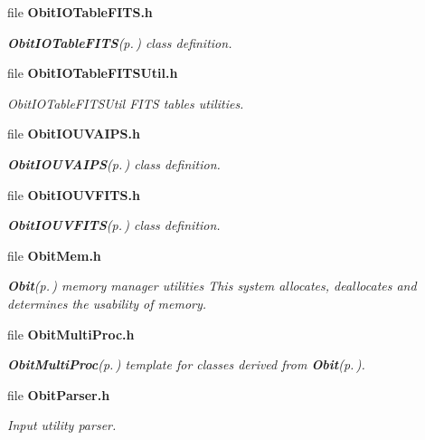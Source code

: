 \begin{CompactItemize}
\item 
file {\bf Obit\-IOTable\-FITS.h}
\begin{CompactList}\small\item\em {\bf Obit\-IOTable\-FITS}{\rm (p.\,\pageref{structObitIOTableFITS})} class definition. \item\end{CompactList}

\item 
file {\bf Obit\-IOTable\-FITSUtil.h}
\begin{CompactList}\small\item\em Obit\-IOTable\-FITSUtil FITS tables utilities. \item\end{CompactList}

\item 
file {\bf Obit\-IOUVAIPS.h}
\begin{CompactList}\small\item\em {\bf Obit\-IOUVAIPS}{\rm (p.\,\pageref{structObitIOUVAIPS})} class definition. \item\end{CompactList}

\item 
file {\bf Obit\-IOUVFITS.h}
\begin{CompactList}\small\item\em {\bf Obit\-IOUVFITS}{\rm (p.\,\pageref{structObitIOUVFITS})} class definition. \item\end{CompactList}

\item 
file {\bf Obit\-Mem.h}
\begin{CompactList}\small\item\em {\bf Obit}{\rm (p.\,\pageref{structObit})} memory manager utilities This system allocates, deallocates and determines the usability of memory. \item\end{CompactList}

\item 
file {\bf Obit\-Multi\-Proc.h}
\begin{CompactList}\small\item\em {\bf Obit\-Multi\-Proc}{\rm (p.\,\pageref{structObitMultiProc})} template for classes derived from {\bf Obit}{\rm (p.\,\pageref{structObit})}. \item\end{CompactList}

\item 
file {\bf Obit\-Parser.h}
\begin{CompactList}\small\item\em Input utility parser. \item\end{CompactList}


\end{CompactItemize}
